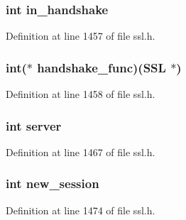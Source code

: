 \subsubsection[{\texorpdfstring{in\+\_\+handshake}{in_handshake}}]{\setlength{\rightskip}{0pt plus 5cm}int in\+\_\+handshake}\hypertarget{structssl__st_a0b9b2b7bc1ae244c06e63d6b82c1ce65}{}\label{structssl__st_a0b9b2b7bc1ae244c06e63d6b82c1ce65}


Definition at line 1457 of file ssl.\+h.

\subsubsection[{\texorpdfstring{handshake\+\_\+func}{handshake_func}}]{\setlength{\rightskip}{0pt plus 5cm}int($\ast$ handshake\+\_\+func)({\bf S\+SL} $\ast$)}\hypertarget{structssl__st_af004e57c8a8ece62b8668c25ac3d4d97}{}\label{structssl__st_af004e57c8a8ece62b8668c25ac3d4d97}


Definition at line 1458 of file ssl.\+h.

\subsubsection[{\texorpdfstring{server}{server}}]{\setlength{\rightskip}{0pt plus 5cm}int server}\hypertarget{structssl__st_ad41e465b11575618bf82f1d45efced5a}{}\label{structssl__st_ad41e465b11575618bf82f1d45efced5a}


Definition at line 1467 of file ssl.\+h.

\subsubsection[{\texorpdfstring{new\+\_\+session}{new_session}}]{\setlength{\rightskip}{0pt plus 5cm}int new\+\_\+session}\hypertarget{structssl__st_a57bf1fbedf3600008cf054e18d06d67c}{}\label{structssl__st_a57bf1fbedf3600008cf054e18d06d67c}


Definition at line 1474 of file ssl.\+h.

